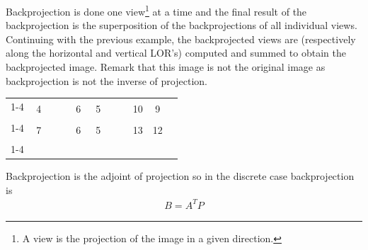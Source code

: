 \documentclass[report,12pt]{report}
\newlength\savedintextsep
\begin{document}
Backprojection is done one view\footnote{A view is the projection of the image in a given direction.} at a time and the final result of the backprojection is the superposition of the backprojections of all individual views.\\

Continuing with the previous example, the backprojected views are (respectively along the horizontal and vertical LOR's) computed and summed to obtain the backprojected image. Remark that this image is not the original image as backprojection is not the inverse of projection.
\setlength\intextsep{\savedintextsep}
\begin{table}[H]
\centering
\begin{tabular}{|c|l|c|l|cc|c|l|c|l|cl|c|l|c|l|}
\cline{1-4} \cline{7-10} \cline{13-16}
\multicolumn{2}{|c|}{\multirow{2}{*}{4}} & \multicolumn{2}{c|}{\multirow{2}{*}{4}} &                    &                    & \multicolumn{2}{c|}{\multirow{2}{*}{6}} & \multicolumn{2}{c|}{\multirow{2}{*}{5}} &                      & \multicolumn{1}{c|}{} & \multicolumn{2}{c|}{\multirow{2}{*}{10}} & \multicolumn{2}{c|}{\multirow{2}{*}{9}}  \\
\multicolumn{2}{|c|}{}                   & \multicolumn{2}{c|}{}                   & \multicolumn{2}{c|}{\multirow{2}{*}{+}} & \multicolumn{2}{c|}{}                   & \multicolumn{2}{c|}{}                   & \multicolumn{2}{c|}{\multirow{2}{*}{=}}      & \multicolumn{2}{c|}{}                    & \multicolumn{2}{c|}{}                    \\ \cline{1-4} \cline{7-10} \cline{13-16} 
\multicolumn{2}{|c|}{\multirow{2}{*}{7}} & \multicolumn{2}{c|}{\multirow{2}{*}{7}} & \multicolumn{2}{c|}{}                   & \multicolumn{2}{c|}{\multirow{2}{*}{6}} & \multicolumn{2}{c|}{\multirow{2}{*}{5}} & \multicolumn{2}{c|}{}                        & \multicolumn{2}{c|}{\multirow{2}{*}{13}} & \multicolumn{2}{c|}{\multirow{2}{*}{12}} \\
\multicolumn{2}{|c|}{}                   & \multicolumn{2}{c|}{}                   &                    &                    & \multicolumn{2}{c|}{}                   & \multicolumn{2}{c|}{}                   & \multicolumn{1}{l}{} &                       & \multicolumn{2}{c|}{}                    & \multicolumn{2}{c|}{}                    \\ \cline{1-4} \cline{7-10} \cline{13-16} 
\end{tabular}
\end{table}

Backprojection is the adjoint of projection so in the discrete case backprojection is
\begin{align}
	B = A^TP
\end{align}
	
\end{document}
